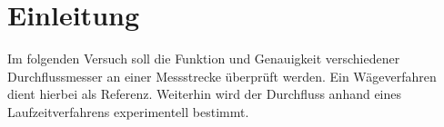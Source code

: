 \section{Einleitung}

Im folgenden Versuch soll die Funktion und Genauigkeit verschiedener Durchflussmesser an einer Messstrecke überprüft werden. Ein Wägeverfahren dient hierbei als Referenz. Weiterhin wird der Durchfluss anhand eines Laufzeitverfahrens experimentell bestimmt.